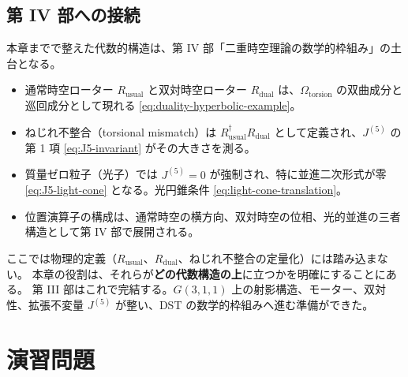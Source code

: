 \documentclass[dvipdfmx,a4paper,oneside]{jsbook}
\numberwithin{equation}{chapter}
\begin{document}
\subsection{第 IV 部への接続}

本章までで整えた代数的構造は、第 IV 部「二重時空理論の数学的枠組み」の土台となる。

\begin{itemize}[leftmargin=2em]
  \item 通常時空ローター \(R_{\mathrm{usual}}\) と双対時空ローター \(R_{\mathrm{dual}}\) は、\(\Omega_{\mathrm{torsion}}\) の双曲成分と巡回成分として現れる \eqref{eq:duality-hyperbolic-example}。
  \item ねじれ不整合（torsional mismatch）は \(R_{\mathrm{usual}}^\dagger R_{\mathrm{dual}}\) として定義され、\(J^{(5)}\) の第 1 項 \eqref{eq:J5-invariant} がその大きさを測る。
  \item 質量ゼロ粒子（光子）では \(J^{(5)} = 0\) が強制され、特に並進二次形式が零 \eqref{eq:J5-light-cone} となる。光円錐条件 \eqref{eq:light-cone-translation}。
  \item 位置演算子の構成は、通常時空の横方向、双対時空の位相、光的並進の三者構造として第 IV 部で展開される。
\end{itemize}

ここでは物理的定義（\(R_{\mathrm{usual}}\)、\(R_{\mathrm{dual}}\)、ねじれ不整合の定量化）には踏み込まない。
本章の役割は、それらが\textbf{どの代数構造の上}に立つかを明確にすることにある。
第 III 部はこれで完結する。\(G(3,1,1)\) 上の射影構造、モーター、双対性、拡張不変量 \(J^{(5)}\) が整い、DST の数学的枠組みへ進む準備ができた。

\section*{演習問題}
\end{document}

